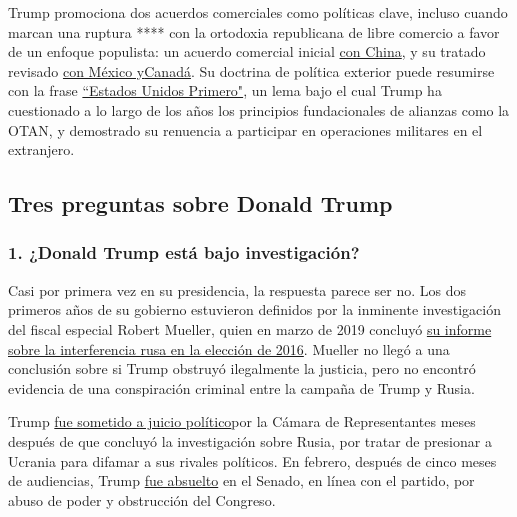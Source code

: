 Trump promociona dos acuerdos comerciales como políticas clave, incluso
cuando marcan una ruptura **** con la ortodoxia republicana de libre
comercio a favor de un enfoque populista: un acuerdo comercial inicial
\href{https://www.nytimes3xbfgragh.onion/2020/01/15/business/economy/china-trade-deal.html}{con
China}, y su tratado revisado
\href{https://www.nytimes3xbfgragh.onion/2019/12/01/us/politics/trump-trade-deal-usmca.html}{con
México
y}\href{https://www.nytimes3xbfgragh.onion/2019/12/01/us/politics/trump-trade-deal-usmca.html}{Canadá}.
Su doctrina de política exterior puede resumirse con la frase
\href{https://www.nytimes3xbfgragh.onion/2018/12/21/us/politics/trump-mattis-american-first-foreign-policy.html}{``Estados
Unidos Primero"}, un lema bajo el cual Trump ha cuestionado a lo largo
de los años los principios fundacionales de alianzas como la OTAN, y
demostrado su renuencia a participar en operaciones militares en el
extranjero.

\hypertarget{tres-preguntas-sobre-donald-trump}{%
\subsection{Tres preguntas sobre Donald
Trump}\label{tres-preguntas-sobre-donald-trump}}

\hypertarget{1-donald-trump-estuxe1-bajo-investigaciuxf3n}{%
\subsubsection{\texorpdfstring{\textbf{1. ¿Donald Trump está bajo
investigación?}}{1. ¿Donald Trump está bajo investigación?}}\label{1-donald-trump-estuxe1-bajo-investigaciuxf3n}}

Casi por primera vez en su presidencia, la respuesta parece ser no. Los
dos primeros años de su gobierno estuvieron definidos por la inminente
investigación del fiscal especial Robert Mueller, quien en marzo de 2019
concluyó
\href{https://www.nytimes3xbfgragh.onion/2019/03/24/us/politics/mueller-report-summary.html}{su
informe sobre la interferencia rusa en la elección de 2016}. Mueller no
llegó a una conclusión sobre si Trump obstruyó ilegalmente la justicia,
pero no encontró evidencia de una conspiración criminal entre la campaña
de Trump y Rusia.

Trump
\href{https://www.nytimes3xbfgragh.onion/2019/12/18/us/politics/trump-impeached.html}{fue
sometido a juicio político}por la Cámara de Representantes meses después
de que concluyó la investigación sobre Rusia, por tratar de presionar a
Ucrania para difamar a sus rivales políticos. En febrero, después de
cinco meses de audiencias, Trump
\href{https://www.nytimes3xbfgragh.onion/2020/02/05/us/politics/trump-acquitted-impeachment.html}{fue
absuelto} en el Senado, en línea con el partido, por abuso de poder y
obstrucción del Congreso.

